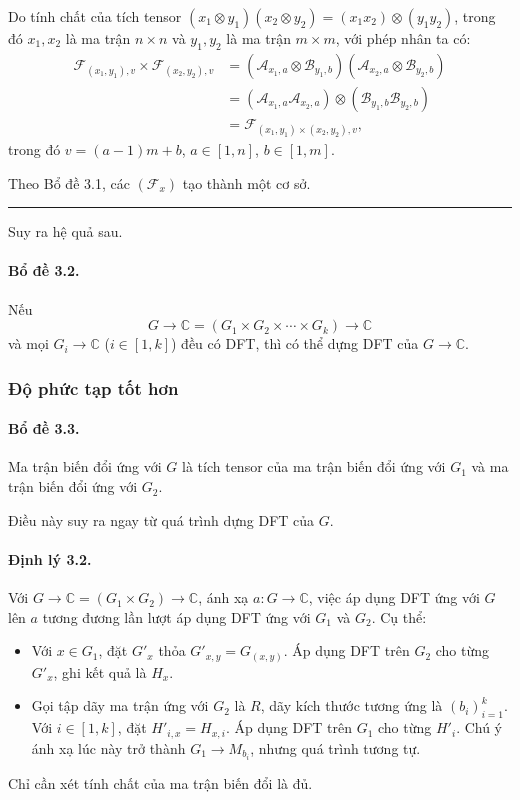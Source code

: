 \documentclass[11pt]{article}
\begin{document}
Do tính chất của tích tensor
$(x_1\otimes y_1)(x_2\otimes y_2)=(x_1x_2)\otimes(y_1y_2)$, trong đó
$x_1,x_2$ là ma trận $n\times n$ và $y_1,y_2$ là ma trận $m\times m$, với phép
nhân ta có:
\[
\begin{aligned}
\mathcal F_{(x_1,y_1),v}\times\mathcal F_{(x_2,y_2),v}
&=(\mathcal A_{x_1,a}\otimes\mathcal B_{y_1,b})
  (\mathcal A_{x_2,a}\otimes\mathcal B_{y_2,b})\\
&=(\mathcal A_{x_1,a}\mathcal A_{x_2,a})\otimes
  (\mathcal B_{y_1,b}\mathcal B_{y_2,b})\\
&=\mathcal F_{(x_1,y_1)\times(x_2,y_2),v},
\end{aligned}
\]
trong đó $v=(a-1)m+b$, $a\in[1,n]$, $b\in[1,m]$.

Theo Bổ đề 3.1, các $(\mathcal F_x)$ tạo thành một cơ sở. \hfill\rule{0.55em}{0.55em}

Suy ra hệ quả sau.

\paragraph{Bổ đề 3.2.}
Nếu
\[
  G\to\mathbb C=(G_1\times G_2\times\cdots\times G_k)\to\mathbb C
\]
và mọi $G_i\to\mathbb C$ ($i\in[1,k]$) đều có DFT, thì có thể dựng DFT của
$G\to\mathbb C$.

\subsubsection{Độ phức tạp tốt hơn}

\paragraph{Bổ đề 3.3.}
Ma trận biến đổi ứng với $G$ là tích tensor của ma trận biến đổi ứng với $G_1$
và ma trận biến đổi ứng với $G_2$.

Điều này suy ra ngay từ quá trình dựng DFT của $G$.

\paragraph{Định lý 3.2.}
Với $G\to\mathbb C=(G_1\times G_2)\to\mathbb C$, ánh xạ
$a:G\to\mathbb C$, việc áp dụng DFT ứng với $G$ lên $a$ tương đương lần lượt áp
dụng DFT ứng với $G_1$ và $G_2$. Cụ thể:
\begin{itemize}
  \item Với $x\in G_1$, đặt $G'_x$ thỏa $G'_{x,y}=G_{(x,y)}$. Áp dụng DFT trên
  $G_2$ cho từng $G'_x$, ghi kết quả là $H_x$.
  \item Gọi tập dãy ma trận ứng với $G_2$ là $R$, dãy kích thước tương ứng là
  $(b_i)_{i=1}^{k}$. Với $i\in[1,k]$, đặt $H'_{i,x}=H_{x,i}$. Áp dụng DFT trên
  $G_1$ cho từng $H'_i$. Chú ý ánh xạ lúc này trở thành $G_1\to M_{b_i}$, nhưng
  quá trình tương tự.
\end{itemize}
Chỉ cần xét tính chất của ma trận biến đổi là đủ.
\end{document}
